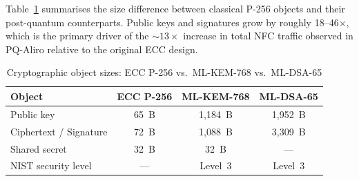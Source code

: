 Table~\ref{tab:sizes} summarises the size difference between classical P-256
objects and their post-quantum counterparts.  Public keys and signatures grow
by roughly 18--46$\times$, which is the primary driver of the $\sim\!13\times$
increase in total NFC traffic observed in PQ-Aliro relative to the original
ECC design.

\begin{table}[t]
\caption{Cryptographic object sizes: ECC P-256 vs.\ ML-KEM-768 vs.\ ML-DSA-65}
\centering
\begin{tabular}{lccc}
\hline
Object & ECC P-256 & ML-KEM-768 & ML-DSA-65 \\
\hline
Public key         & 65~B    & 1{,}184~B & 1{,}952~B \\
Ciphertext / Signature & 72~B & 1{,}088~B & 3{,}309~B \\
Shared secret      & 32~B    & 32~B      & ---       \\
NIST security level & ---    & Level~3   & Level~3   \\
\hline
\end{tabular}
\label{tab:sizes}
\end{table}
